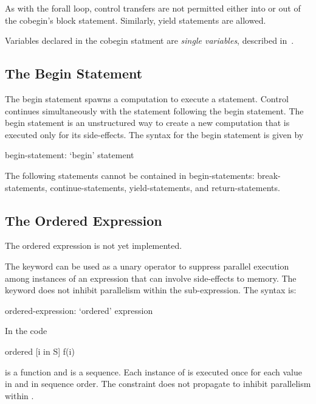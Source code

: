 As with the forall loop, control transfers are not permitted
either into or out of the cobegin's block statement. Similarly,
yield statements are allowed.

Variables declared in the cobegin statment are {\em single variables},
described in~.

\subsection{The Begin Statement}
\label{Begin}

The begin statement spawns a computation to execute a statement.
Control continues simultaneously with the statement following the
begin statement. The begin statement is an unstructured way to create
a new computation that is executed only for its side-effects. The
syntax for the begin statement is given by
\begin{syntax}
begin-statement:
  `begin' statement
\end{syntax}

The following statements cannot be contained in begin-statements:
break-statements, continue-statements, yield-statements, and
return-statements.

\subsection{The Ordered Expression}
\label{Ordered_Expressions}

\begin{implementation}
The ordered expression is not yet implemented.
\end{implementation}

The  keyword can be used as a unary operator to suppress
parallel execution among instances of an expression that can involve
side-effects to memory.  The  keyword does not inhibit
parallelism within the sub-expression.  The syntax is:
\begin{syntax}
ordered-expression:
   `ordered' expression
\end{syntax}

\begin{example}
In the code
\begin{chapel}
ordered [i in S] f(i) 
\end{chapel}
 is a function and  is a
sequence. Each instance of  is executed once for each value
in  and in sequence order. The  constraint does
not propagate to inhibit parallelism within .
\end{example}

